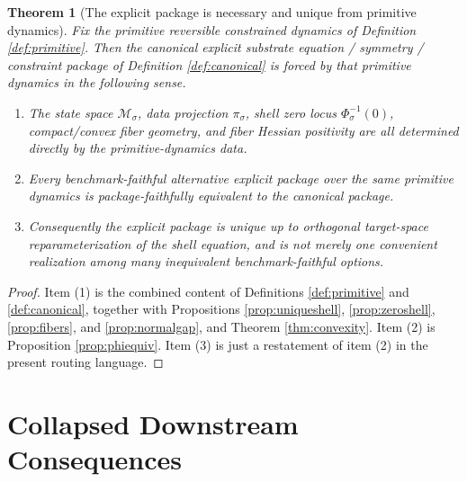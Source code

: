 \documentclass[11pt]{article}
\newcommand{\SubSpace}[1]{\mathcal M_{#1}}
\newcommand{\DataProj}[1]{\pi_{#1}}
\newcommand{\ShellEquation}[1]{\Phi_{#1}}
\newtheorem{theorem}{Theorem}
\begin{document}
\begin{theorem}[The explicit package is necessary and unique from primitive dynamics]
\label{thm:necessity}
Fix the primitive reversible constrained dynamics of Definition \ref{def:primitive}. Then the canonical explicit substrate equation / symmetry / constraint package of Definition \ref{def:canonical} is forced by that primitive dynamics in the following sense.
\begin{enumerate}
    \item The state space \(\SubSpace{\sigma}\), data projection \(\DataProj{\sigma}\), shell zero locus \(\ShellEquation{\sigma}^{-1}(0)\), compact/convex fiber geometry, and fiber Hessian positivity are all determined directly by the primitive-dynamics data.
    \item Every benchmark-faithful alternative explicit package over the same primitive dynamics is package-faithfully equivalent to the canonical package.
    \item Consequently the explicit package is unique up to orthogonal target-space reparameterization of the shell equation, and is not merely one convenient realization among many inequivalent benchmark-faithful options.
\end{enumerate}
\end{theorem}

\begin{proof}
Item (1) is the combined content of Definitions \ref{def:primitive} and \ref{def:canonical}, together with Propositions \ref{prop:uniqueshell}, \ref{prop:zeroshell}, \ref{prop:fibers}, and \ref{prop:normalgap}, and Theorem \ref{thm:convexity}. Item (2) is Proposition \ref{prop:phiequiv}. Item (3) is just a restatement of item (2) in the present routing language.
\end{proof}

\section{Collapsed Downstream Consequences}
\end{document}

